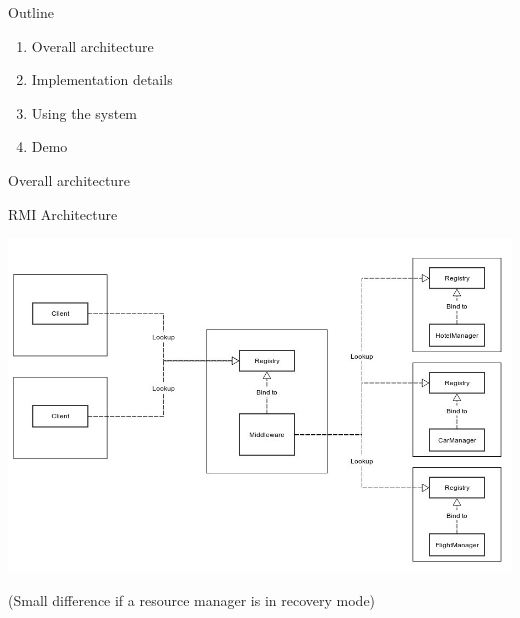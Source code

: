 \documentclass{beamer}
\begin{document}
\begin{frame}{Outline}
  \begin{enumerate}
  \item Overall architecture
  \item Implementation details
  \item Using the system
  \item Demo
  \end{enumerate}
\end{frame}


\begin{frame}
  \Huge{Overall architecture}
\end{frame}


\begin{frame}{RMI Architecture}
  \begin{center}
    \includegraphics[scale=0.3]{rmi.jpg}
  \end{center}

  (Small difference if a resource manager is in recovery mode)
\end{frame}
\end{document}
